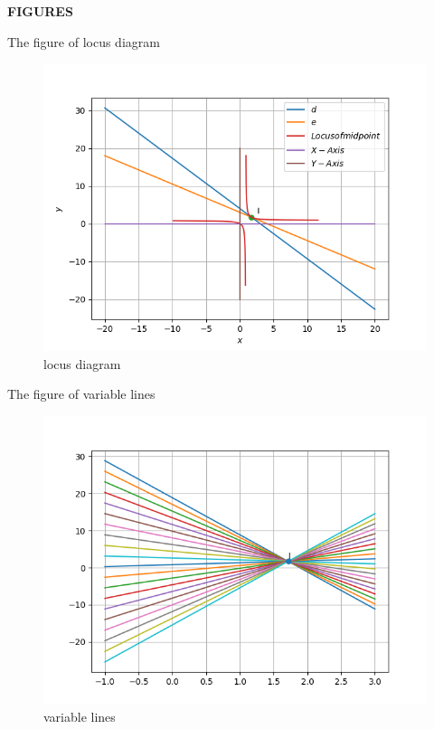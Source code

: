 \documentclass{beamer}
\begin{document}
\begin{frame}
\textbf{FIGURES}


The figure of locus diagram
\begin{figure}
\includegraphics[scale=0.5]{locus}
\caption{locus diagram}
\end{figure}

\end{frame}
\begin{frame}
The figure of variable lines
\begin{figure}
\includegraphics[scale=0.5]{variable_lines}
\caption{variable lines}
\end{figure}

\end{frame}
\end{document}
